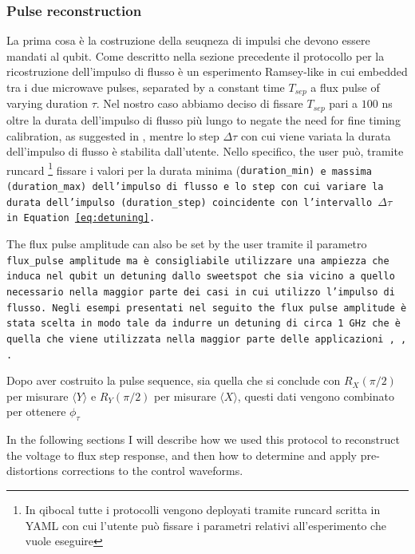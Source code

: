 \subsubsection{Pulse reconstruction}
La prima cosa è la costruzione della seuqneza di impulsi che devono essere mandati al qubit.
Come descritto nella sezione precedente il protocollo per la ricostruzione dell'impulso di flusso è un esperimento Ramsey-like in cui embedded tra i due microwave pulses, separated by a constant time $T_{sep}$ a flux pulse of varying duration $\tau$.
Nel nostro caso abbiamo deciso di fissare $T_{sep}$ pari a $100$ ns oltre la durata dell'impulso di flusso più lungo to negate the need for fine timing calibration, as suggested in \cite{rol_time-domain_2020}, mentre lo step $\Delta\tau$ con cui viene variata la durata dell'impulso di flusso è stabilita dall'utente.
Nello specifico, the user può, tramite runcard \footnote{In qibocal tutte i protocolli vengono deployati tramite runcard scritta in YAML con cui l'utente può fissare i parametri relativi all'esperimento che vuole eseguire} fissare i valori per la durata minima (\tt{duration\_min}) e massima (\tt{duration\_max}) dell'impulso di flusso e lo step con cui variare la durata dell'impulso (\tt{duration\_step}) coincidente con l'intervallo $\Delta\tau$ in Equation \ref{eq:detuning}.

The flux pulse amplitude can also be set by the user tramite il parametro \tt{flux\_pulse amplitude} ma è consigliabile utilizzare una ampiezza che induca nel qubit un detuning dallo sweetspot che sia vicino a quello necessario nella maggior parte dei casi in cui utilizzo l'impulso di flusso.
Negli esempi presentati nel seguito the flux pulse amplitude è stata scelta in modo tale da indurre un detuning di circa 1 GHz che è quella che viene utilizzata nella maggior parte delle applicazioni \cite{Langford2017}, \cite{Bultink_2020}, \cite{Rol2019iju}.

Dopo aver costruito la pulse sequence, sia quella che si conclude con $R_X(\pi/2)$ per misurare $\langle Y \rangle$ e $R_Y(\pi/2)$ per misurare $\langle X \rangle$, questi dati vengono combinato per ottenere $\phi_\tau$

In the following sections I will describe how we used this protocol to reconstruct the voltage to flux step response, and then how to determine and apply pre-distortions corrections to the control waveforms.


